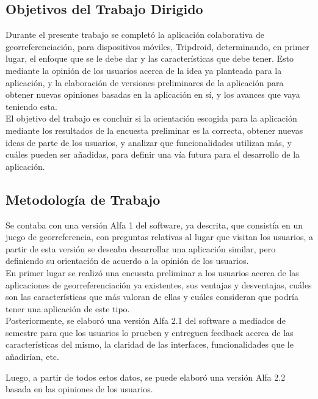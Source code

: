 \documentclass[10pt,letterpaper]{article}
\begin{document}
\newpage
\subsection{Objetivos del Trabajo Dirigido}

Durante el presente trabajo se completó la aplicación colaborativa de georreferenciación, para dispositivos móviles, Tripdroid, determinando, en primer lugar, el enfoque que se le debe dar y las características que debe tener. Esto mediante la opinión de los usuarios acerca de la idea ya planteada para la aplicación, y la elaboración de versiones preliminares de la aplicación para obtener nuevas opiniones basadas en la aplicación en sí, y los avances que vaya teniendo esta.\\

El objetivo del trabajo es concluir si la orientación escogida para la aplicación mediante los resultados de la encuesta preliminar es la correcta, obtener nuevas ideas de parte de los usuarios, y analizar que funcionalidades utilizan más, y cuáles pueden ser añadidas, para definir una vía futura para el desarrollo de la aplicación.

\subsection{Metodología de Trabajo}

Se contaba con una versión Alfa 1 del software, ya descrita, que consistía en un juego de georreferencia, con preguntas relativas al lugar que visitan los usuarios, a partir de esta versión se deseaba desarrollar una aplicación similar, pero definiendo su orientación de acuerdo a la opinión de los usuarios.\\

En primer lugar se realizó una encuesta preliminar a los usuarios acerca de las aplicaciones de georreferenciación ya existentes, sus ventajas y desventajas, cuáles son las características que más valoran de ellas y cuáles consideran que podría tener una aplicación de este tipo.\\

Posteriormente, se elaboró una versión Alfa 2.1 del software a mediados de semestre para que los usuarios lo prueben y entreguen feedback acerca de las características del mismo, la claridad de las interfaces, funcionalidades que le añadirían, etc.

Luego, a partir de todos estos datos, se puede elaboró una versión Alfa 2.2 basada en las opiniones de los usuarios.\\
\end{document}
